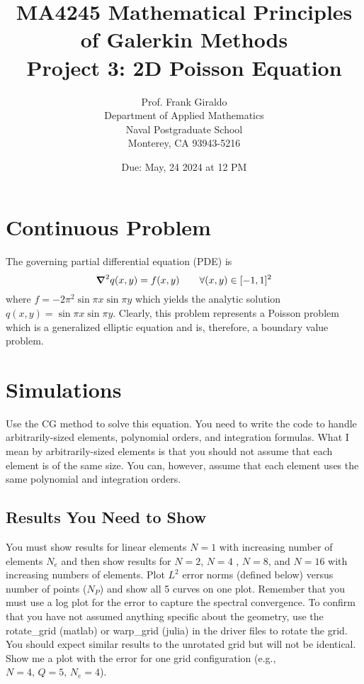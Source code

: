 \documentclass[10pt]{article}
\newcommand{\vc}[1]{\mbox{\boldmath$#1$\unboldmath}}
\newcommand{\grad}{\vc{\nabla}}
\begin{document}
\title{MA4245 Mathematical Principles of Galerkin Methods \\
Project 3: 2D Poisson Equation}
\author{Prof. Frank Giraldo \\
Department of Applied Mathematics \\
Naval Postgraduate School \\
Monterey, CA 93943-5216}
\date{Due: May, 24 2024 at 12 PM}
\maketitle

\section{Continuous Problem}
The governing partial differential equation (PDE) is
\[
\grad^2 q(x,y) = f(x,y) \qquad \forall (x,y) \in [-1,1]^2
\]
where $f=-2 \pi^2 \sin \pi x \sin \pi y$ which yields the analytic solution $q(x,y) = \sin \pi x \sin \pi y$. 
Clearly, this problem represents a Poisson problem which is a generalized elliptic equation and is, therefore, a boundary value problem. 

\section{Simulations}
Use the CG  method to solve this equation. 
You need to write the code to handle arbitrarily-sized elements, polynomial orders, and integration formulas. What I mean by arbitrarily-sized elements is that you should not assume that each element is of the same size. 
You can, however, assume that each element uses the same polynomial and integration orders.

\subsection{Results You Need to Show}
You must show results for linear elements $N=1$ with increasing number of elements $N_e$ and then show results for 
$N=2$, $N=4$ , $N=8$, and $N=16$ with increasing numbers of elements. Plot $L^2$ error norms (defined below) versus number of points ($N_P$) and show all 5 curves on one plot. Remember that you must use 
a log plot for the error to capture the spectral convergence. To confirm that you have not assumed anything specific about the geometry, use the rotate\_grid (matlab) or warp\_grid (julia) in the driver files to rotate the grid.  You should expect similar results to the unrotated grid but will not be identical.  Show me a plot with the error for one grid configuration (e.g., $N=4, \,Q=5, \, N_e=4$).
\end{document}
